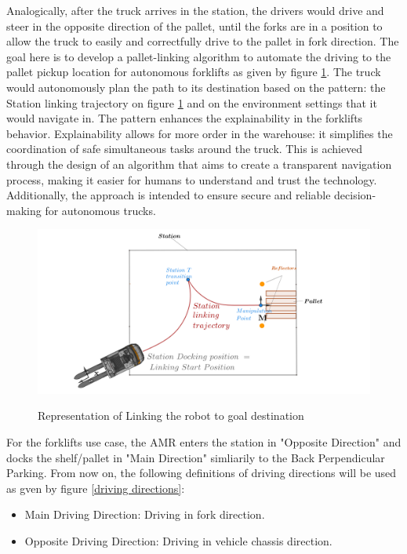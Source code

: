 Analogically, after the truck arrives in the station, the drivers would drive and steer in the opposite direction of the 
pallet, until the forks are in a position to allow the truck to easily and correctfully drive to the pallet in fork direction.
The goal here is to develop a pallet-linking algorithm to automate the driving to the pallet pickup location for 
autonomous forklifts as given by figure \ref{pattern}. The truck would autonomously plan the path to its destination
based on the pattern: the Station linking trajectory on figure \ref{pattern} and on the environment settings that it would navigate in. 
The pattern enhances the explainability in the forklifts behavior. Explainability allows for more order in the warehouse: 
it simplifies the coordination of safe simultaneous tasks around the truck. This is achieved through the design of an 
algorithm that aims to create a transparent navigation process, making it easier for humans to understand and trust 
the technology. Additionally, the approach is intended to ensure secure and reliable decision-making for autonomous trucks.



\begin{figure}
    [H]
    \begin{center}
    \includegraphics[width=\linewidth]{images/Chap2/station-without-subpolygones.png}\\
    \caption{Representation of Linking the robot to goal destination \cite{R28}}
    \label{pattern}
    \end{center}
\end{figure}
For the forklifts use case, the AMR enters the station in "Opposite Direction" and docks the shelf/pallet in 
"Main Direction" simliarily to the Back Perpendicular Parking.
From now on, the following definitions of driving directions will be used as gven by figure \ref{driving directions}:
\begin{itemize}
    \item Main Driving Direction: Driving in fork direction.
    \item Opposite Driving Direction: Driving in vehicle chassis direction.
\end{itemize}

